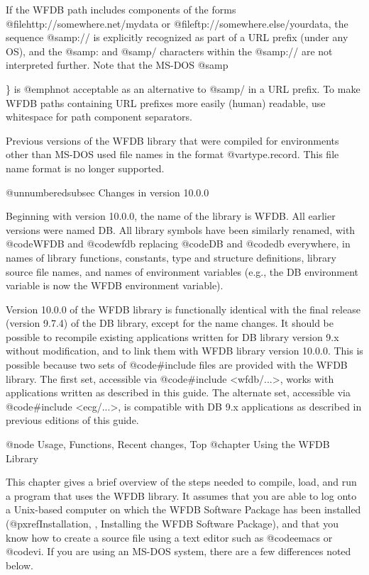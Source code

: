 If the WFDB path includes components of the forms
@file{http://somewhere.net/mydata} or @file{ftp://somewhere.else/yourdata}, the
sequence @samp{://} is explicitly recognized as part of a URL prefix (under any
OS), and the @samp{:} and @samp{/} characters within the @samp{://} are not
interpreted further.  Note that the MS-DOS @samp{\} is @emph{not} acceptable as
an alternative to @samp{/} in a URL prefix.  To make WFDB paths containing URL
prefixes more easily (human) readable, use whitespace for path component
separators.

Previous versions of the WFDB library that were compiled for environments other
than MS-DOS used file names in the format @var{type.record}.  This file
name format is no longer supported.

@unnumberedsubsec Changes in version 10.0.0

Beginning with version 10.0.0, the name of the library is WFDB.  All
earlier versions were named DB.  All library symbols have been similarly
renamed, with @code{WFDB} and @code{wfdb} replacing @code{DB} and @code{db}
everywhere, in names of library functions, constants, type and structure
definitions, library source file names, and names of environment variables
(e.g., the DB environment variable is now the WFDB environment variable).

Version 10.0.0 of the WFDB library is functionally identical with the
final release (version 9.7.4) of the DB library, except for the name
changes.  It should be possible to recompile existing applications
written for DB library version 9.x without modification, and to link
them with WFDB library version 10.0.0.  This is possible because two
sets of @code{#include} files are provided with the WFDB library.  The
first set, accessible via @code{#include <wfdb/...>}, works with
applications written as described in this guide.  The alternate set,
accessible via @code{#include <ecg/...>}, is compatible with DB 9.x
applications as described in previous editions of this guide.

@node     Usage, Functions, Recent changes, Top
@chapter Using the WFDB Library

This chapter gives a brief overview of the steps needed to compile,
load, and run a program that uses the WFDB library.  It assumes that you
are able to log onto a Unix-based computer on which the WFDB Software
Package has been installed
(@pxref{Installation, , Installing the WFDB Software Package}),
and that you know how to create a source file using a text editor such
as @code{emacs} or @code{vi}.  If you are using an MS-DOS system, there
are a few differences noted below.


}
